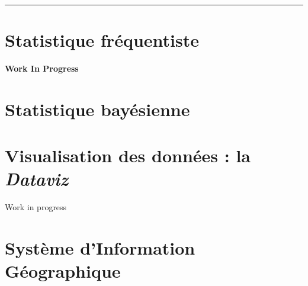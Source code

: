 \documentclass[
]{book}
\newenvironment{infobox}[1]
  {
  \begin{itemize}
  \renewcommand{\labelitemi}{
    \raisebox{-.7\height}[0pt][0pt]{
      {\setkeys{Gin}{width=3em,keepaspectratio}
        \texttt{[image: images/\#1]}}
    }
  }
  \setlength{\fboxsep}{1em}
  \begin{blackbox}
  \item
  }
  {
  \end{blackbox}
  \end{itemize}
  }
\begin{document}
\begin{center}\rule{0.5\linewidth}{0.5pt}\end{center}

\hypertarget{frequentiste}{%
\chapter{Statistique fréquentiste}\label{frequentiste}}

\begin{infobox}{caution}

\textbf{Work In Progress}

\end{infobox}

\hypertarget{bayesienne}{%
\chapter{Statistique bayésienne}\label{bayesienne}}

\hypertarget{dataviz}{%
\chapter{\texorpdfstring{Visualisation des données : la \emph{Dataviz}}{Visualisation des données : la Dataviz}}\label{dataviz}}

Work in progress

\hypertarget{SIG}{%
\chapter{Système d'Information Géographique}\label{SIG}}

\printbibliography
\end{document}

